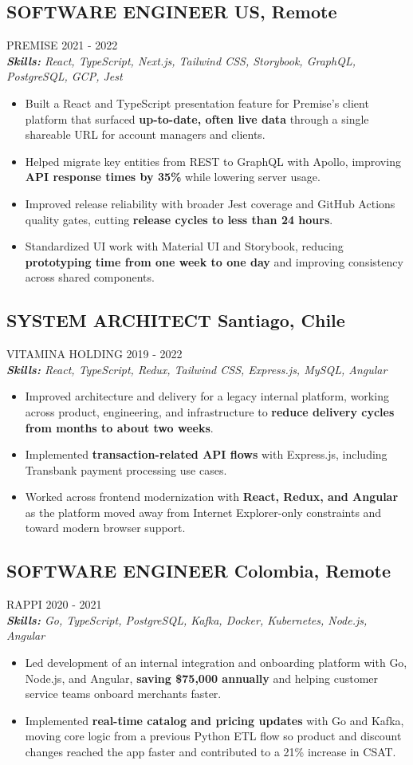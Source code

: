 \documentclass{article}
\newcommand{\WorkExperience}[2]{
   \subsection*{#1}
   \vspace{-1em}
   \uppercase{#2}
}
\newcommand{\Skills}[1]{
   \textit{\textbf{Skills:} #1}
}
\begin{document}
\WorkExperience{SOFTWARE ENGINEER \hfill US, Remote}{Premise \hfill 2021 {-} 2022} \\
\Skills{React, TypeScript, Next.js, Tailwind CSS, Storybook, GraphQL, PostgreSQL, GCP, Jest}
\begin{itemize}
	\item Built a React and TypeScript presentation feature for Premise's client platform that surfaced \textbf{up-to-date, often live data} through a single shareable URL for account managers and clients.
	\item Helped migrate key entities from REST to GraphQL with Apollo, improving \textbf{API response times by 35\%} while lowering server usage.
	\item Improved release reliability with broader Jest coverage and GitHub Actions quality gates, cutting \textbf{release cycles to less than 24 hours}.
	\item Standardized UI work with Material UI and Storybook, reducing \textbf{prototyping time from one week to one day} and improving consistency across shared components.
\end{itemize}

\WorkExperience{SYSTEM ARCHITECT \hfill Santiago, Chile}{Vitamina Holding \hfill 2019 {-} 2022} \\
\Skills{React, TypeScript, Redux, Tailwind CSS, Express.js, MySQL, Angular}
\begin{itemize}
	\item Improved architecture and delivery for a legacy internal platform, working across product, engineering, and infrastructure to \textbf{reduce delivery cycles from months to about two weeks}.
	\item Implemented \textbf{transaction-related API flows} with Express.js, including Transbank payment processing use cases.
	\item Worked across frontend modernization with \textbf{React, Redux, and Angular} as the platform moved away from Internet Explorer-only constraints and toward modern browser support.
\end{itemize}

\WorkExperience{SOFTWARE ENGINEER \hfill Colombia, Remote}{Rappi \hfill 2020 {-} 2021} \\
\Skills{Go, TypeScript, PostgreSQL, Kafka, Docker, Kubernetes, Node.js, Angular}
\begin{itemize}
	\item Led development of an internal integration and onboarding platform with Go, Node.js, and Angular, \textbf{saving \$75,000 annually} and helping customer service teams onboard merchants faster.
	\item Implemented \textbf{real-time catalog and pricing updates} with Go and Kafka, moving core logic from a previous Python ETL flow so product and discount changes reached the app faster and contributed to a 21\% increase in CSAT.
\end{itemize}
\end{document}
